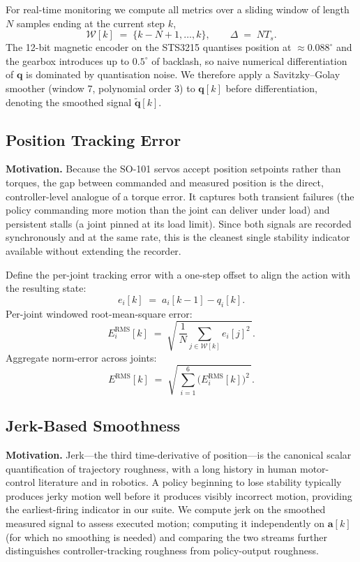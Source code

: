 For real-time monitoring we compute all metrics over a sliding window of
length $N$ samples ending at the current step $k$,
\begin{equation}
    \mathcal{W}[k] \;=\; \{k - N + 1, \ldots, k\}, \qquad \Delta \;=\; N T_s.
\end{equation}
The 12-bit magnetic encoder on the STS3215 quantises position at $\approx
0.088^\circ$ and the gearbox introduces up to $0.5^\circ$ of backlash, so
naive numerical differentiation of $\mathbf{q}$ is dominated by quantisation
noise. We therefore apply a Savitzky--Golay smoother (window 7, polynomial
order 3) to $\mathbf{q}[k]$ before differentiation, denoting the smoothed
signal $\tilde{\mathbf{q}}[k]$.

\subsection{Position Tracking Error}

\textbf{Motivation.} Because the SO-101 servos accept position setpoints
rather than torques, the gap between commanded and measured position is the
direct, controller-level analogue of a torque error. It captures both
transient failures (the policy commanding more motion than the joint can
deliver under load) and persistent stalls (a joint pinned at its load limit).
Since both signals are recorded synchronously and at the same rate, this is
the cleanest single stability indicator available without extending the
recorder.

Define the per-joint tracking error with a one-step offset to align the
action with the resulting state:
\begin{equation}
    e_i[k] \;=\; a_i[k-1] - q_i[k].
\end{equation}
Per-joint windowed root-mean-square error:
\begin{equation}
    E_i^{\mathrm{RMS}}[k] \;=\; \sqrt{\,\frac{1}{N} \sum_{j \in \mathcal{W}[k]} e_i[j]^2\,}.
\end{equation}
Aggregate norm-error across joints:
\begin{equation}
    E^{\mathrm{RMS}}[k] \;=\; \sqrt{\,\sum_{i=1}^{6} \big(E_i^{\mathrm{RMS}}[k]\big)^2\,}.
\end{equation}

\subsection{Jerk-Based Smoothness}

\textbf{Motivation.} Jerk---the third time-derivative of position---is the
canonical scalar quantification of trajectory roughness, with a long history
in human motor-control literature and in robotics. A policy beginning to lose
stability typically produces jerky motion well before it produces visibly
incorrect motion, providing the earliest-firing indicator in our suite. We
compute jerk on the smoothed measured signal to assess executed motion;
computing it independently on $\mathbf{a}[k]$ (for which no smoothing is
needed) and comparing the two streams further distinguishes
controller-tracking roughness from policy-output roughness.

